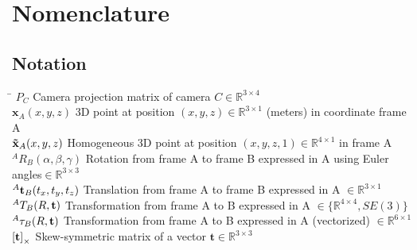 \begin{abstract}
\lipsum[1-3]
\end{abstract}

\chapter*{Nomenclature}\label{ch:symbols}

\section*{Notation}
\label{sec:notation}

\begin{tabbing}
	\hspace*{3.0cm}		\= \kill
	$P_C$ \> Camera projection matrix of camera $C \in \mathbb{R}^{3\times4}$ \\[0.75ex]
	$\mathbf{x}_A(x,y,z)$ \> 3D point at position $(x,y,z) \in \mathbb{R}^{3\times1}$ (meters) in coordinate frame A \\[0.75ex]
	$\mathbf{\tilde{x}}_A(x,y,z)$ \> Homogeneous 3D point at position $(x,y,z,1) \in \mathbb{R}^{4\times1}$ in frame A \\[0.75ex]
	$^AR_{B}(\alpha, \beta, \gamma)$ \> Rotation from frame A to frame B expressed in A using Euler angles$\in \mathbb{R}^{3\times3}$ \\[0.75ex]
	$^A\mathbf{t}_{B}(t_x,t_y,t_z)$ \> Translation from frame A to frame B expressed in A $\in \mathbb{R}^{3\times1}$ \\[0.75ex]
	$^{A}T_{B}(R,\mathbf{t})$ \> Transformation from frame A to B expressed in A $\in \{\mathbb{R}^{4\times4},SE(3)\}$ \\[0.75ex]
	$\t2v{A}{B}(R,\trans)$ \> Transformation from frame A to B expressed in A (vectorized) $\in \mathbb{R}^{6\times1}$ \\[0.75ex]
	${\left[\mathbf{t}\right]}_\times$ \> Skew-symmetric matrix of a vector $\mathbf{t} \in \mathbb{R}^{3\times3}$
\end{tabbing}

